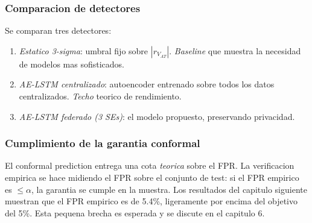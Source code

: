 \subsubsection{Comparacion de detectores}

Se comparan tres detectores:
\begin{enumerate}[leftmargin=*,itemsep=2pt]
  \item \emph{Estatico 3-sigma}: umbral fijo sobre $|r_{V_{AT}}|$.
        \emph{Baseline} que muestra la necesidad de modelos mas
        sofisticados.
  \item \emph{AE-LSTM centralizado}: autoencoder entrenado sobre
        todos los datos centralizados. \emph{Techo} teorico de
        rendimiento.
  \item \emph{AE-LSTM federado (3 SEs)}: el modelo propuesto,
        preservando privacidad.
\end{enumerate}

\subsubsection{Cumplimiento de la garantia conformal}

El conformal prediction entrega una cota \emph{teorica} sobre el FPR.
La verificacion empirica se hace midiendo el FPR sobre el conjunto
de test: si el FPR empirico es $\le \alpha$, la garantia se cumple
en la muestra. Los resultados del capitulo siguiente muestran que
el FPR empirico es de 5.4\%, ligeramente por encima del objetivo del
5\%. Esta pequena brecha es esperada y se discute en el capitulo 6.